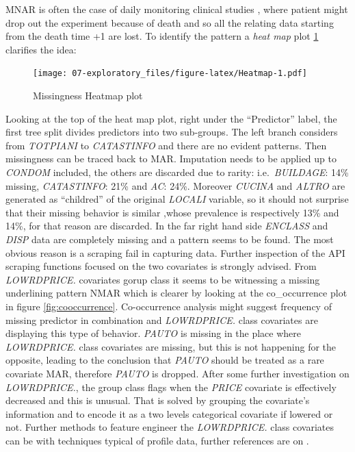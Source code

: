 \documentclass[
  12pt,
  a4paper,
  oneside]{book}
\theoremstyle{definition}
\theoremstyle{definition}
\theoremstyle{definition}
\theoremstyle{remark}
\begin{document}
MNAR is often the case of daily monitoring clinical studies \citep{Kuhn}, where patient might drop out the experiment because of death and so all the relating data starting from the death time +1 are lost.
To identify the pattern a \emph{heat map} plot \ref{fig:Heatmap} clarifies the idea:

\begin{figure}
\centering
\texttt{[image: 07-exploratory\_files/figure-latex/Heatmap-1.pdf]}
\caption{\label{fig:Heatmap}Missingness Heatmap plot}
\end{figure}

Looking at the top of the heat map plot, right under the ``Predictor'' label, the first tree split divides predictors into two sub-groups. The left branch considers from \emph{TOTPIANI} to \emph{CATASTINFO} and there are no evident patterns. Then missingness can be traced back to MAR. Imputation needs to be applied up to \emph{CONDOM} included, the others are discarded due to rarity: i.e.~\emph{BUILDAGE}: 14\% missing, \emph{CATASTINFO}: 21\% and \emph{AC}: 24\%. Moreover \emph{CUCINA} and \emph{ALTRO} are generated as ``childred'' of the original \emph{LOCALI} variable, so it should not surprise that their missing behavior is similar ,whose prevalence is respectively 13\% and 14\%, for that reason are discarded.
In the far right hand side \emph{ENCLASS} and \emph{DISP} data are completely missing and a pattern seems to be found. The most obvious reason is a scraping fail in capturing data. Further inspection of the API scraping functions focused on the two covariates is strongly advised. From \emph{LOWRDPRICE.} covariates gorup class it seems to be witnessing a missing underlining pattern NMAR which is clearer by looking at the co\_occurrence plot in figure \ref{fig:cooccurrence}. Co-occurrence analysis might suggest frequency of missing predictor in combination and \emph{LOWRDPRICE.} class covariates are displaying this type of behavior. \emph{PAUTO} is missing in the place where \emph{LOWRDPRICE.} class covariates are missing, but this is not happening for the opposite, leading to the conclusion that \emph{PAUTO} should be treated as a rare covariate MAR, therefore \emph{PAUTO} is dropped.
After some further investigation on \emph{LOWRDPRICE.}, the group class flags when the \emph{PRICE} covariate is effectively decreased and this is unusual. That is solved by grouping the covariate's information and to encode it as a two levels categorical covariate if lowered or not. Further methods to feature engineer the \emph{LOWRDPRICE.} class covariates can be with techniques typical of profile data, further references are on \citet{Kuhn}.
\end{document}
